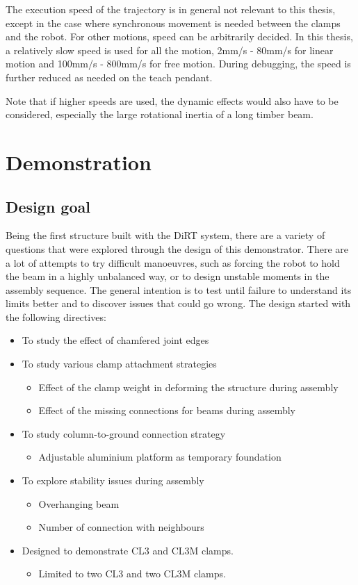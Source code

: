 The execution speed of the trajectory is in general not relevant to this thesis, except in the case where synchronous movement is needed between the clamps and the robot. For other motions, speed can be arbitrarily decided. In this thesis, a relatively slow speed is used for all the motion, 2mm/s - 80mm/s for linear motion and 100mm/s - 800mm/s for free motion. During debugging, the speed is further reduced as needed on the teach pendant. 

Note that if higher speeds are used, the dynamic effects would also have to be considered, especially the large rotational inertia of a long timber beam.

\section{Demonstration}
\subsection{Design goal}

Being the first structure built with the DiRT system, there are a variety of questions that were explored through the design of this demonstrator. There are a lot of attempts to try difficult manoeuvres, such as forcing the robot to hold the beam in a highly unbalanced way, or to design unstable moments in the assembly sequence. The general intention is to test until failure to understand its limits better and to discover issues that could go wrong. The design started with the following directives:
\begin{itemize}
    \item To study the effect of chamfered joint edges
    \item To study various clamp attachment strategies
    \begin{itemize}
        \item Effect of the clamp weight in deforming the structure during assembly
        \item Effect of the missing connections for beams during assembly
    \end{itemize}
    \item To study column-to-ground connection strategy
    \begin{itemize}
        \item Adjustable aluminium platform as temporary foundation
    \end{itemize}
    \item To explore stability issues during assembly
    \begin{itemize}
        \item Overhanging beam
        \item Number of connection with neighbours
    \end{itemize}
    \item Designed to demonstrate CL3 and CL3M clamps.
    \begin{itemize}
        \item Limited to two CL3 and two CL3M clamps.
    \end{itemize}
\end{itemize}

